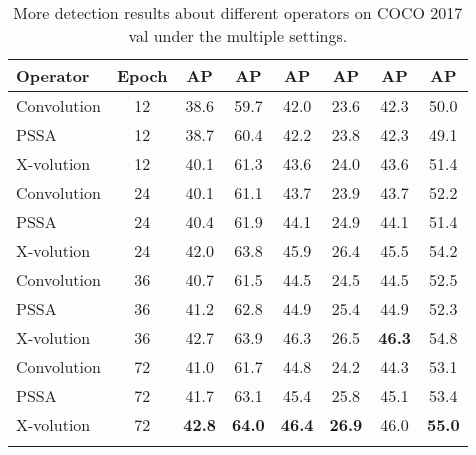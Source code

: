 \documentclass{article}
\newcommand{\cgap}[2]{
	\fontsize{6pt}{1em}\selectfont{({#2})}
}
\newcommand{\apbbox}[1]{AP}
\begin{document}
\begin{table*}[!htb]\centering
 \caption{More detection results about different operators on COCO 2017 val under the multiple settings. 
}
 \label{tab:more det results}
 \begin{spacing}{1.05}
 \small
 \setlength\tabcolsep{5pt}
 \begin{threeparttable}
 \begin{tabular}{l|c|c|c|c|c|c|c}
        \Xhline{1.1pt}
        Operator
        & Epoch
		& \fontsize{8pt}{1em}\selectfont \quad\apbbox{~}
		& \fontsize{8pt}{1em}\selectfont \quad\apbbox{50}
		& \fontsize{8pt}{1em}\selectfont \quad\apbbox{75}
		& \fontsize{8pt}{1em}\selectfont \quad\apbbox{S}
		& \fontsize{8pt}{1em}\selectfont \quad\apbbox{M}
		& \fontsize{8pt}{1em}\selectfont \quad\apbbox{L} \\ \hline


		Convolution & 12 & 38.6 & 59.7 & 42.0 & 23.6 & 42.3 & 50.0 \\ 
		PSSA & 12 & 38.7\cgap{+}{0.1} & 60.4\cgap{+}{0.7} & 42.2\cgap{+}{0.2} & 23.8\cgap{+}{0.2} & 42.3\cgap{+}{0.0} & 49.1\cgap{-}{0.9} \\ 
	    X-volution & 12 & 40.1\cgap{+}{1.5} & 61.3\cgap{+}{1.6} & 43.6\cgap{+}{1.6} & 24.0\cgap{+}{0.4} & 43.6\cgap{+}{1.3} & 51.4\cgap{+}{1.4} \\
	
		\cline{1-8}
		
		Convolution & 24 & 40.1 & 61.1 & 43.7 & 23.9 & 43.7 & 52.2 \\ 
		PSSA & 24 & 40.4\cgap{+}{0.3} & 61.9\cgap{+}{0.8} & 44.1\cgap{+}{0.4} & 24.9\cgap{+}{1.0} & 44.1\cgap{+}{0.4} & 51.4\cgap{-}{0.8} \\ 
	    X-volution  & 24 & 42.0\cgap{+}{1.9}  & 63.8\cgap{+}{2.7} & 45.9\cgap{+}{2.2} & 26.4\cgap{+}{2.5} & 45.5\cgap{+}{1.8} & 54.2\cgap{+}{2.0} \\ 
	    \cline{1-8}
	    
		Convolution & 36 & 40.7 & 61.5 & 44.5 & 24.5 & 44.5 & 52.5 \\ 
		PSSA & 36 & 41.2\cgap{+}{0.5} & 62.8\cgap{+}{1.3} & 44.9\cgap{+}{0.4} & 25.4\cgap{+}{0.9} & 44.9\cgap{+}{0.4} & 52.3\cgap{-}{0.2} \\  
	    X-volution & 36 & 42.7\cgap{+}{2.0} & 63.9\cgap{+}{2.4} & 46.3\cgap{+}{1.8} & 26.5\cgap{+}{2.0} & \textbf{46.3}\cgap{+}{1.8} & 54.8\cgap{+}{2.3} \\
	    \cline{1-8}
	    
		Convolution & 72 & 41.0   & 61.7 & 44.8 & 24.2 & 44.3 & 53.1 \\ 
		PSSA & 72 & 41.7\cgap{+}{0.7} & 63.1\cgap{+}{1.4} & 45.4\cgap{+}{0.6} & 25.8\cgap{+}{1.6} & 45.1\cgap{+}{0.8} & 53.4\cgap{+}{0.3} \\ 
	    X-volution & 72 & \textbf{42.8}\cgap{+}{1.8} & \textbf{64.0}\cgap{+}{2.3} & \textbf{46.4}\cgap{+}{1.6} & \textbf{26.9}\cgap{+}{2.7} & 46.0\cgap{+}{1.7}   & \textbf{55.0}\cgap{+}{1.9}   \\
		\Xhline{1.0pt}
		
\end{tabular}
\end{threeparttable}
\end{spacing}
\end{table*}
\end{document}
